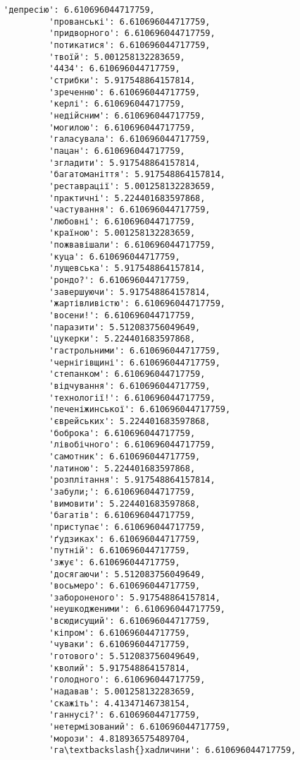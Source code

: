 \documentclass[11pt]{article}
\begin{document}
\begin{Verbatim}[commandchars=\\\{\}]
         'депресію': 6.610696044717759,
         'прованські': 6.610696044717759,
         'придворного': 6.610696044717759,
         'потикатися': 6.610696044717759,
         'твоїй': 5.001258132283659,
         '4434': 6.610696044717759,
         'стрибки': 5.917548864157814,
         'зреченню': 6.610696044717759,
         'керлі': 6.610696044717759,
         'недійсним': 6.610696044717759,
         'могилою': 6.610696044717759,
         'галасувала': 6.610696044717759,
         'пацан': 6.610696044717759,
         'згладити': 5.917548864157814,
         'багатоманіття': 5.917548864157814,
         'реставрації': 5.001258132283659,
         'практичні': 5.224401683597868,
         'частування': 6.610696044717759,
         'любовні': 6.610696044717759,
         'країною': 5.001258132283659,
         'пожвавішали': 6.610696044717759,
         'куца': 6.610696044717759,
         'лущевська': 5.917548864157814,
         'рондо?': 6.610696044717759,
         'завершуючи': 5.917548864157814,
         'жартівливістю': 6.610696044717759,
         'восени!': 6.610696044717759,
         'паразити': 5.512083756049649,
         'цукерки': 5.224401683597868,
         'гастрольними': 6.610696044717759,
         'чернігівщині': 6.610696044717759,
         'степанком': 6.610696044717759,
         'відчування': 6.610696044717759,
         'технології!': 6.610696044717759,
         'печеніжинської': 6.610696044717759,
         'єврейських': 5.224401683597868,
         'боброка': 6.610696044717759,
         'лівобічного': 6.610696044717759,
         'самотник': 6.610696044717759,
         'латиною': 5.224401683597868,
         'розплітання': 5.917548864157814,
         'забули;': 6.610696044717759,
         'вимовити': 5.224401683597868,
         'багатів': 6.610696044717759,
         'приступає': 6.610696044717759,
         'ґудзиках': 6.610696044717759,
         'путній': 6.610696044717759,
         'зжує': 6.610696044717759,
         'досягаючи': 5.512083756049649,
         'восьмеро': 6.610696044717759,
         'забороненого': 5.917548864157814,
         'неушкодженими': 6.610696044717759,
         'всюдисущий': 6.610696044717759,
         'кіпром': 6.610696044717759,
         'чуваки': 6.610696044717759,
         'готового': 5.512083756049649,
         'кволий': 5.917548864157814,
         'голодного': 6.610696044717759,
         'надавав': 5.001258132283659,
         'скажіть': 4.41347146738154,
         'ганнусі?': 6.610696044717759,
         'нетермізований': 6.610696044717759,
         'морози': 4.818936575489704,
         'га\textbackslash{}xadличини': 6.610696044717759,

\end{Verbatim}
\end{document}

